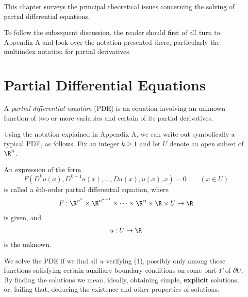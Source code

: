 

This chapter surveys the principal theoretical issues concerning the solving of partial differential equations.

To follow the subsequent discussion, the reader should first of all turn to Appendix A and look over the notation presented there, particularly the multiindex notation for partial derivatives.

\section{Partial Differential Equations}
\label{sec:pde-introduction}

A \textit{partial differential equation} (PDE) is an equation involving an unknown function of two or more variables and certain of its partial derivatives.

Using the notation explained in Appendix A, we can write out symbolically a typical PDE, as follows. Fix an integer $k \geq 1$ and let $U$ denote an open subset of $\R^n$.

\begin{definition}
\label{def:kth-order-pde}
\leanok
An expression of the form
\begin{equation}
F(D^k u(x), D^{k-1} u(x), \ldots, Du(x), u(x), x) = 0 \qquad (x \in U)
\tag{1}
\end{equation}
is called a $k$th-order partial differential equation, where
$$F : \R^{n^k} \times \R^{n^{k-1}} \times \cdots \times \R^n \times \R \times U \to \R$$
is given, and
$$u : U \to \R$$
is the unknown.
\end{definition}

We solve the PDE if we find all $u$ verifying (1), possibly only among those functions satisfying certain auxiliary boundary conditions on some part $\Gamma$ of $\partial U$. By finding the solutions we mean, ideally, obtaining simple, \textbf{explicit} solutions, or, failing that, deducing the existence and other properties of solutions.

